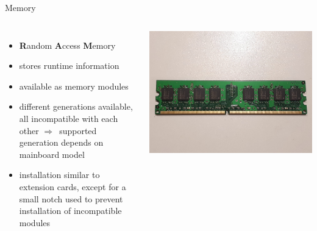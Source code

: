 \documentclass[10pt, graphics, aspectratio=169, table]{beamer}
\newcommand{\ra}{$\Rightarrow$\ }
\begin{document}
    \begin{frame}{Memory}
        \begin{columns}
                \begin{itemize}
                    \item \textbf{R}andom \textbf{A}ccess \textbf{M}emory
                    \item stores runtime information
                    \item available as memory modules
                    \item different generations available, all incompatible with each other \ra supported generation depends on mainboard model
                    \item installation similar to extension cards, except for a small notch used to prevent installation of incompatible modules
                \end{itemize}
                \center\includegraphics[scale=0.1]{img/ram.jpeg}
        \end{columns}
    \end{frame}
    
\end{document}
